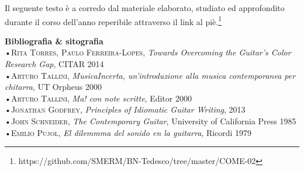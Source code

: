 \documentclass[oneside]{article}
\begin{document}
\begin{multicols*}{2}
Il seguente testo è a corredo dal materiale elaborato, studiato ed approfondito durante il corso dell'anno reperibile attraverso il link al piè.\footnote{https://github.com/SMERM/BN-Tedesco/tree/master/COME-02}

\hspace*{10mm}

\textbf{\textsf{Bibliografia \& sitografia}}\\
•\textsc{\textsf {Rita Torres, Paulo Ferreira-Lopes}}, \emph{Towards Overcoming the Guitar's Color Research Gap}, CITAR 2014\\
•\textsc{\textsf {Arturo Tallini}}, \emph{MusicaIncerta, un'introduzione alla musica contemporanea per chitarra}, UT Orpheus 2000\\
•\textsc{\textsf {Arturo Tallini}}, \emph{Ma! con note scritte}, Editor 2000\\
•\textsc{\textsf {Jonathan Godfrey}}, \emph{Principles of Idiomatic Guitar Writing},  2013\\
•\textsc{\textsf {John Schneider}}, \emph{The Contemporary Guitar},  University of California Press 1985\\
•\textsc{\textsf {Emilio Pujol}}, \emph{El dilemmma del sonido en la guitarra}, Ricordi 1979\\






\end{multicols*}
\end{document}
